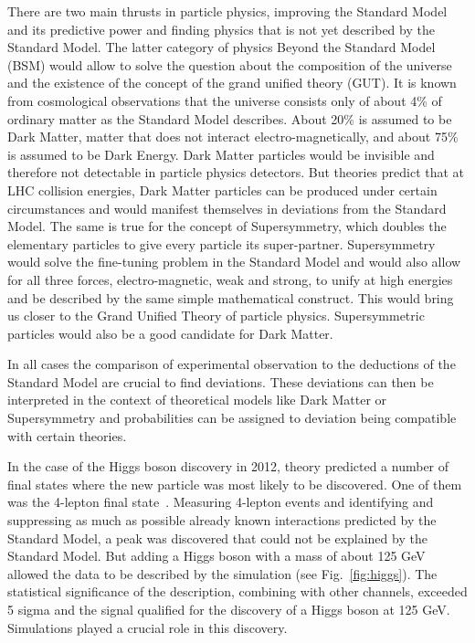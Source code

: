 \documentclass{wscpaperproc}
\theoremstyle{wsc}
\begin{document}
There are two main thrusts in particle physics, improving the Standard Model and its predictive power and finding physics that is not yet described by the Standard Model. The latter category of physics Beyond the Standard Model (BSM) would allow to solve the question about the composition of the universe and the existence of the concept of the grand unified theory (GUT). It is known from cosmological observations that the universe consists only of about 4\% of ordinary matter as the Standard Model describes. About 20\% is assumed to be Dark Matter, matter that does not interact electro-magnetically, and about 75\% is assumed to be Dark Energy. Dark Matter particles would be invisible and therefore not detectable in particle physics detectors. But theories predict that at LHC collision energies, Dark Matter particles can be produced under certain circumstances and would manifest themselves in deviations from the Standard Model. The same is true for the concept of Supersymmetry, which doubles the elementary particles to give every particle its super-partner. Supersymmetry would solve the fine-tuning problem in the Standard Model and would also allow for all three forces, electro-magnetic, weak and strong, to unify at high energies and be described by the same simple mathematical construct. This would bring us closer to the Grand Unified Theory of particle physics. Supersymmetric particles would also be a good candidate for Dark Matter.

In all cases the comparison of experimental observation to the deductions of the Standard Model are crucial to find deviations. These deviations can then be interpreted in the context of theoretical models like Dark Matter or Supersymmetry and probabilities can be assigned to deviation being compatible with certain theories.

In the case of the Higgs boson discovery in 2012, theory predicted a number of final states where the new particle was most likely to be discovered. One of them was the 4-lepton final state~. Measuring 4-lepton events and identifying and suppressing as much as possible already known interactions predicted by the Standard Model, a peak was discovered that could not be explained by the Standard Model. But adding a Higgs boson with a mass of about 125 GeV allowed the data to be described by the simulation (see Fig.~\ref{fig:higgs}). The statistical significance of the description, combining with other channels, exceeded 5 sigma and the signal qualified for the discovery of a Higgs boson at 125 GeV. Simulations played a crucial role in this discovery.
\end{document}
